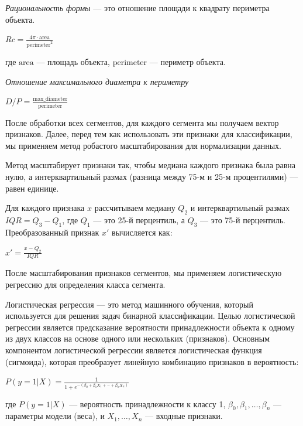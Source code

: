 		\textit{Рациональность формы} — это отношение площади к квадрату периметра объекта\cite{MYarovoy}.
		\begin{center}
			$Rc = \frac{4 \pi \cdot \text{area}}{\text{perimeter}^2}$
		\end{center}
		где \( \text{area} \) — площадь объекта, \( \text{perimeter} \) — периметр объекта.


\textit{Отношение максимального диаметра к периметру}
		\begin{center}
			$D/P = \frac{\text{max\_diameter}}{\text{perimeter}}$
		\end{center}


После обработки всех сегментов, для каждого сегмента мы получаем вектор признаков. 
Далее, перед тем как использовать эти признаки для классификации, мы применяем метод
робастого масштабирования для нормализации данных.

Метод масштабирует признаки так, чтобы медиана каждого признака была равна нулю, 
а интерквартильный размах (разница между 75-м и 25-м процентилями) — равен единице\cite{MJHan}. 

Для каждого признака \( x \) рассчитываем медиану \( Q_2 \) и интерквартильный размах 
\( IQR = Q_3 - Q_1 \), где \( Q_1 \) — это 25-й перцентиль, а \( Q_3 \) — это 75-й перцентиль. 
Преобразованный признак \( x' \) вычисляется как:

\begin{center}
	$x' = \frac{x - Q_2}{IQR}$
\end{center}
  
После масштабирования признаков сегментов, мы применяем логистическую регрессию для 
определения класса сегмента.

Логистическая регрессия — это метод машинного обучения, который используется для 
решения задач бинарной классификации. Целью логистической регрессии является предсказание 
вероятности принадлежности объекта к одному из двух классов на основе одного или 
нескольких (признаков). Основным компонентом логистической регрессии является 
логистическая функция (сигмоида), которая преобразует линейную комбинацию 
признаков в вероятность\cite{MSergeev}:

\begin{center}
	$P(y=1|X) = \frac{1}{1 + e^{-(\beta_0 + \beta_1 X_1 + \cdots + \beta_n X_n)}}$
\end{center}

где \( P(y=1|X) \) — вероятность принадлежности к классу 1, \( \beta_0, \beta_1, \ldots, \beta_n \) — параметры модели (веса), и \( X_1, \ldots, X_n \) — входные признаки.

